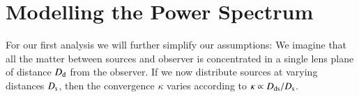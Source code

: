 \section{Modelling the Power Spectrum}
\label{sec:modelling_single_lens}
For our first analysis we will further simplify our assumptions: We imagine that all the matter between sources and observer is concentrated in a single lens plane of distance $D_{\rm d}$ from the observer. If we now distribute sources at varying distances $D_{\rm s}$, then the convergence $\kappa$ varies according to $\kappa \propto D_{\rm{ds}}/D_{\rm s}$. 



